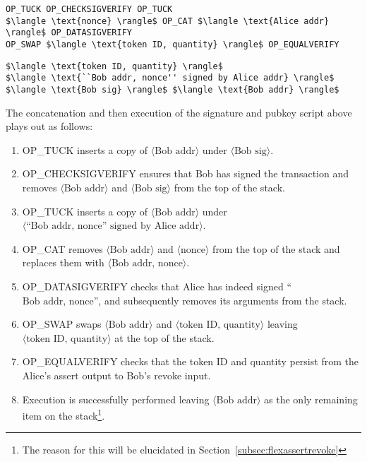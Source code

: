 \documentclass[9pt,oneside]{amsart}
\begin{document}
\begin{multicols}{2}

\begin{lstlisting}[title={\textbf{Alice's Assert PubKey Script}}]
OP_TUCK OP_CHECKSIGVERIFY OP_TUCK
$\langle \text{nonce} \rangle$ OP_CAT $\langle \text{Alice addr} \rangle$ OP_DATASIGVERIFY
OP_SWAP $\langle \text{token ID, quantity} \rangle$ OP_EQUALVERIFY
\end{lstlisting}

\begin{lstlisting}[title={\textbf{Bob's Revoke Signature Script}}]
$\langle \text{token ID, quantity} \rangle$ 
$\langle \text{``Bob addr, nonce'' signed by Alice addr} \rangle$ $\langle \text{Bob sig} \rangle$ $\langle \text{Bob addr} \rangle$ 
\end{lstlisting}

The concatenation and then execution of the signature and pubkey script above plays out as follows:
\begin{enumerate}
    \item OP\_TUCK inserts a copy of $\langle \text{Bob addr} \rangle$ under $\langle \text{Bob sig} \rangle$.
    \item OP\_CHECKSIGVERIFY ensures that Bob has signed the transaction and removes $\langle \text{Bob addr} \rangle$ and $\langle \text{Bob sig} \rangle$ from the top of the stack.
    \item OP\_TUCK inserts a copy of $\langle \text{Bob addr} \rangle$ under $\langle \text{``Bob addr, nonce'' signed by Alice addr} \rangle$.
    \item OP\_CAT removes $\langle \text{Bob addr} \rangle$ and $\langle \text{nonce} \rangle$ from the top of the stack and replaces them with $\langle \text{Bob addr, nonce} \rangle$. 
    \item OP\_DATASIGVERIFY  checks that Alice has indeed signed ``$\text{Bob addr, nonce}$'', and subsequently removes its arguments from the stack.
    \item OP\_SWAP swaps $\langle \text{Bob addr} \rangle$ and $\langle \text{token ID, quantity} \rangle$ leaving $\langle \text{token ID, quantity} \rangle$ at the top of the stack.
    \item OP\_EQUALVERIFY checks that the token ID and quantity persist from the Alice's assert output to Bob's revoke input.
    \item Execution is successfully performed leaving $\langle \text{Bob addr} \rangle$ as the only remaining item on the stack\footnote{The reason for this will be elucidated in Section~\ref{subsec:flexassertrevoke}}.
\end{enumerate}


\end{multicols}
\end{document}
